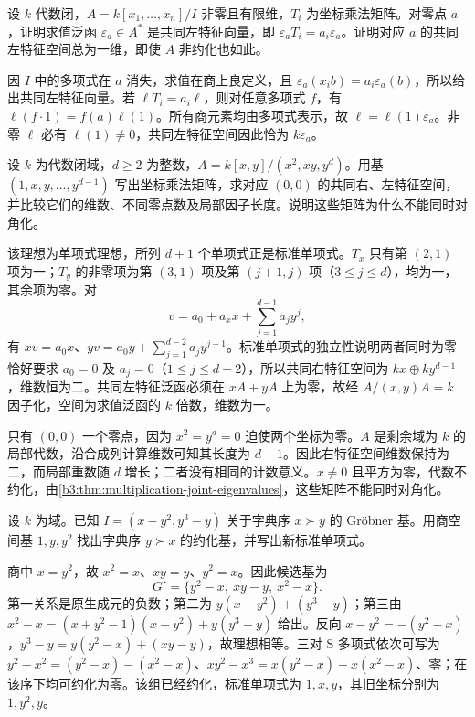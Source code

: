 \begin{exercise}\label{b3:ex:08-joint-eigenvalues}
	设 \(k\) 代数闭，\(A=k[x_1,\ldots,x_n]/I\) 非零且有限维，\(T_i\) 为坐标乘法矩阵。对零点 \(a\)，证明求值泛函 \(\varepsilon_a\in A^*\) 是共同左特征向量，即 \(\varepsilon_aT_i=a_i\varepsilon_a\)。证明对应 \(a\) 的共同左特征空间总为一维，即使 \(A\) 非约化也如此。
\end{exercise}
\begin{solution}
	因 \(I\) 中的多项式在 \(a\) 消失，求值在商上良定义，且 \(\varepsilon_a(x_ib)=a_i\varepsilon_a(b)\)，所以给出共同左特征向量。若 \(\ell T_i=a_i\ell\)，则对任意多项式 \(f\)，有 \(\ell(f\cdot1)=f(a)\ell(1)\)。所有商元素均由多项式表示，故 \(\ell=\ell(1)\varepsilon_a\)。非零 \(\ell\) 必有 \(\ell(1)\ne0\)，共同左特征空间因此恰为 \(k\varepsilon_a\)。
\end{solution}

\begin{exercise}\label{b3:ex:08-simultaneous-diagonalization}
	设 \(k\) 为代数闭域，\(d\ge2\) 为整数，\(A=k[x,y]/(x^2,xy,y^d)\)。用基 \((1,x,y,\ldots,y^{d-1})\) 写出坐标乘法矩阵，求对应 \((0,0)\) 的共同右、左特征空间，并比较它们的维数、不同零点数及局部因子长度。说明这些矩阵为什么不能同时对角化。
\end{exercise}
\begin{solution}
	该理想为单项式理想，所列 \(d+1\) 个单项式正是标准单项式。\(T_x\) 只有第 \((2,1)\) 项为一；\(T_y\) 的非零项为第 \((3,1)\) 项及第 \((j+1,j)\) 项（\(3\le j\le d\)），均为一，其余项为零。对
	\[
		v=a_0+a_xx+\sum_{j=1}^{d-1}a_jy^j,
	\]
	有 \(xv=a_0x\)、\(yv=a_0y+\sum_{j=1}^{d-2}a_jy^{j+1}\)。标准单项式的独立性说明两者同时为零恰好要求 \(a_0=0\) 及 \(a_j=0\)（\(1\le j\le d-2\)），所以共同右特征空间为 \(kx\oplus ky^{d-1}\)，维数恒为二。共同左特征泛函必须在 \(xA+yA\) 上为零，故经 \(A/(x,y)A=k\) 因子化，空间为求值泛函的 \(k\) 倍数，维数为一。

	只有 \((0,0)\) 一个零点，因为 \(x^2=y^d=0\) 迫使两个坐标为零。\(A\) 是剩余域为 \(k\) 的局部代数，沿合成列计算维数可知其长度为 \(d+1\)。因此右特征空间维数保持为二，而局部重数随 \(d\) 增长；二者没有相同的计数意义。\(x\ne0\) 且平方为零，代数不约化，由\cref{b3:thm:multiplication-joint-eigenvalues}，这些矩阵不能同时对角化。
\end{solution}

\begin{exercise}\label{b3:ex:08-fglm-small}
	设 \(k\) 为域。已知 \(I=(x-y^2,y^3-y)\) 关于字典序 \(x\succ y\) 的 Gröbner 基。用商空间基 \(1,y,y^2\) 找出字典序 \(y\succ x\) 的约化基，并写出新标准单项式。
\end{exercise}
\begin{solution}
	商中 \(x=y^2\)，故 \(x^2=x\)、\(xy=y\)、\(y^2=x\)。因此候选基为
	\[
		G'=\{y^2-x,\ xy-y,\ x^2-x\}.
	\]
	第一关系是原生成元的负数；第二为 \(y(x-y^2)+(y^3-y)\)；第三由 \(x^2-x=(x+y^2-1)(x-y^2)+y(y^3-y)\) 给出。反向 \(x-y^2=-(y^2-x)\)，\(y^3-y=y(y^2-x)+(xy-y)\)，故理想相等。三对 S 多项式依次可写为 \(y^2-x^2=(y^2-x)-(x^2-x)\)、\(xy^2-x^3=x(y^2-x)-x(x^2-x)\)、零；在该序下均可约化为零。该组已经约化，标准单项式为 \(1,x,y\)，其旧坐标分别为 \(1,y^2,y\)。
\end{solution}

